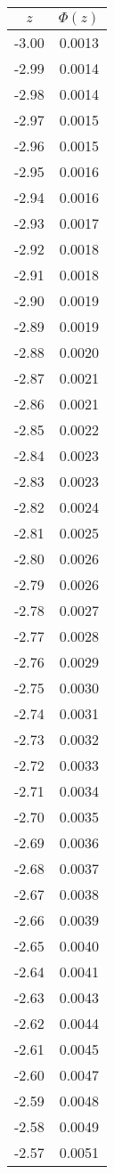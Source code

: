 \begin{tabular}{|c|c|}\hline
$z$ & $\Phi(z)$ \\ \hline
-3.00 & 0.0013\\
-2.99 & 0.0014\\
-2.98 & 0.0014\\
-2.97 & 0.0015\\
-2.96 & 0.0015\\
-2.95 & 0.0016\\
-2.94 & 0.0016\\
-2.93 & 0.0017\\
-2.92 & 0.0018\\
-2.91 & 0.0018\\
-2.90 & 0.0019\\
-2.89 & 0.0019\\
-2.88 & 0.0020\\
-2.87 & 0.0021\\
-2.86 & 0.0021\\
-2.85 & 0.0022\\
-2.84 & 0.0023\\
-2.83 & 0.0023\\
-2.82 & 0.0024\\
-2.81 & 0.0025\\
-2.80 & 0.0026\\
-2.79 & 0.0026\\
-2.78 & 0.0027\\
-2.77 & 0.0028\\
-2.76 & 0.0029\\
-2.75 & 0.0030\\
-2.74 & 0.0031\\
-2.73 & 0.0032\\
-2.72 & 0.0033\\
-2.71 & 0.0034\\
-2.70 & 0.0035\\
-2.69 & 0.0036\\
-2.68 & 0.0037\\
-2.67 & 0.0038\\
-2.66 & 0.0039\\
-2.65 & 0.0040\\
-2.64 & 0.0041\\
-2.63 & 0.0043\\
-2.62 & 0.0044\\
-2.61 & 0.0045\\
-2.60 & 0.0047\\
-2.59 & 0.0048\\
-2.58 & 0.0049\\
-2.57 & 0.0051\\

\end{tabular}

